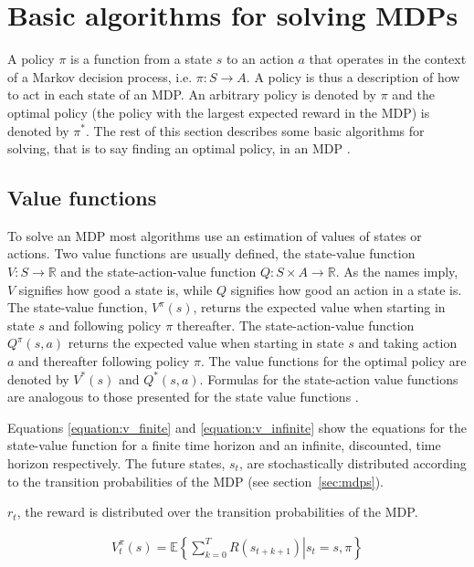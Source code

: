 \section{Basic algorithms for solving MDPs}

A policy $\pi$ is a function from a state $s$ to an action $a$ that operates in
the context of a Markov decision process, i.e. $\pi \colon S \to A$. A policy
is thus a description of how to act in each state of an MDP. An arbitrary
policy is denoted by $\pi$ and the optimal policy (the policy with the largest
expected reward in the MDP) is denoted by $\pi^*$. The rest of this section
describes some basic algorithms for solving, that is to say finding an optimal
policy, in an MDP \parencite{barto1998reinforcement}.

\subsection{Value functions}

To solve an MDP most algorithms use an estimation of values of states or
actions. Two value functions are usually defined, the state-value function $V :
S \to \mathbb R$ and the state-action-value function $Q : S \times A \to
\mathbb R$. As the names imply, $V$ signifies how good a state is, while $Q$
signifies how good an action in a state is. The state-value function,
$V^\pi(s)$, returns the expected value when starting in state $s$ and following
policy $\pi$ thereafter. The state-action-value function $Q^\pi(s, a)$ returns
the expected value when starting in state $s$ and taking action $a$ and
thereafter following policy $\pi$. The value functions for the optimal policy
are denoted by $V^*(s)$ and $Q^*(s, a)$. Formulas for the state-action value
functions are analogous to those presented for the state value functions
\parencite{barto1998reinforcement}. 

Equations \eqref{equation:v_finite} and \eqref{equation:v_infinite} show the
equations for the state-value function for a finite time horizon and an
infinite, discounted, time horizon respectively. The future states, $s_t$, 
are stochastically distributed according to the transition probabilities
of the MDP (see section~\ref{sec:mdps}).

$r_t$, the reward is
distributed over the transition probabilities of the MDP.

\begin{align}
\label{equation:v_finite}
V_t^\pi(s) = \mathbb{E} \left\{
  \left. \sum^{T}_{k=0} R(s_{t+k+1})
  \right\vert s_t = s, \pi
\right\}
\end{align}

